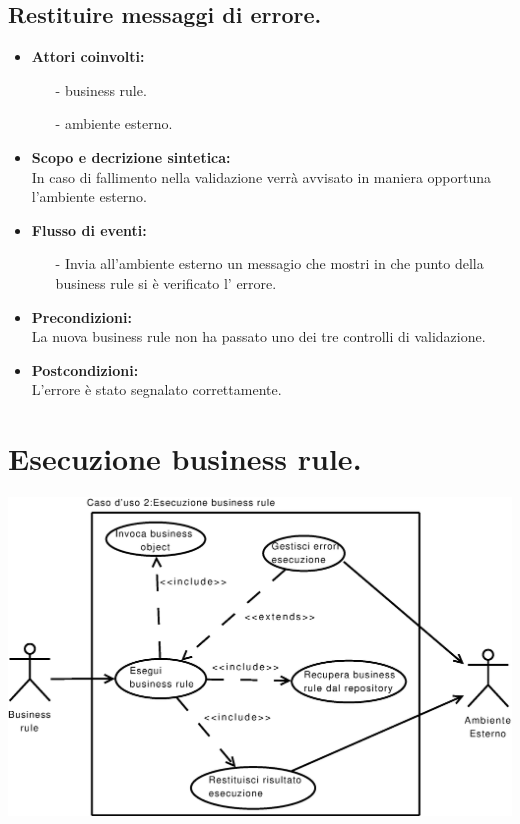 \documentclass[11pt,titlepage,a4paper]{report}
\begin{document}
\subsection{Restituire messaggi di errore.}
\begin{itemize}
\item{\textbf{Attori coinvolti:}}
\begin{itemize}
\item[-]  business rule.
\item[-] ambiente esterno.
\end{itemize}
\item{\textbf{Scopo e decrizione sintetica:}}\\
In caso di fallimento nella validazione verr\`a avvisato in maniera opportuna l'ambiente esterno.
\item{\textbf{Flusso di eventi:}}
\begin{itemize}
 \item[-] Invia all'ambiente esterno un messagio che mostri in che punto della business rule si \`e verificato l' errore.
\end{itemize}
\item{\textbf{Precondizioni:}}\\
La nuova business rule non ha passato uno dei tre controlli di validazione.
\item{\textbf{Postcondizioni:}}\\
L'errore \`e stato segnalato correttamente.
\end{itemize}
\section{Esecuzione business rule.}
\begin{center}
 \includegraphics[width=1\textwidth]{Esegui-regola.eps}

\end{center}
\end{document}

